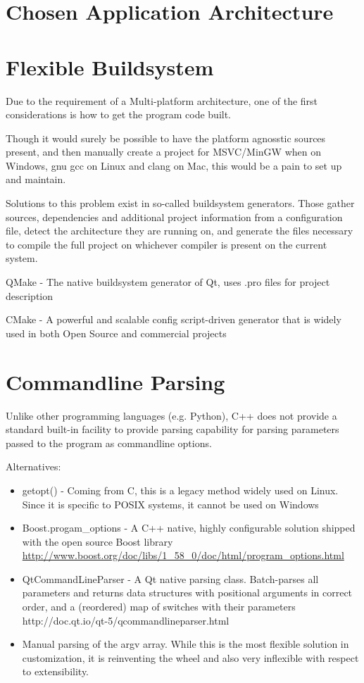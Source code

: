 \section{Chosen Application Architecture}




\section{Flexible Buildsystem}
Due to the requirement of a Multi-platform architecture, one of the first considerations is how to get the program code built.

Though it would surely be possible to have the platform agnosstic sources present, and then manually create a project for MSVC/MinGW when on Windows, gnu gcc on Linux and clang on Mac, this would be a pain to set up and maintain.

Solutions to this problem exist in so-called buildsystem generators. Those gather sources, dependencies and additional project information from a configuration file, detect the architecture they are running on, and generate the files necessary to compile the full project on whichever compiler is present on the current system.

QMake - The native buildsystem generator of Qt, uses .pro files for project description

CMake - A powerful and scalable config script-driven generator that is widely used in both Open Source and commercial projects 


\section{Commandline Parsing}
Unlike other programming languages (e.g. Python), C++ does not provide a standard built-in facility to provide parsing capability for parsing parameters passed to the program as commandline options.

Alternatives:

\begin{itemize}
\item getopt() - Coming from C, this is a legacy method widely used on Linux. Since it is specific to POSIX systems, it cannot be used on Windows 
\item Boost.progam\_options - A C++ native, highly configurable solution shipped with the open source Boost library
\url{http://www.boost.org/doc/libs/1\_58\_0/doc/html/program\_options.html}
\item QtCommandLineParser - A Qt native parsing class. Batch-parses all parameters and returns data structures with positional arguments in correct order, and a (reordered) map of switches with their parameters
http://doc.qt.io/qt-5/qcommandlineparser.html
\item Manual parsing of the argv array. While this is the most flexible solution in customization, it is reinventing the wheel and also very inflexible with respect to extensibility.
\end{itemize}

